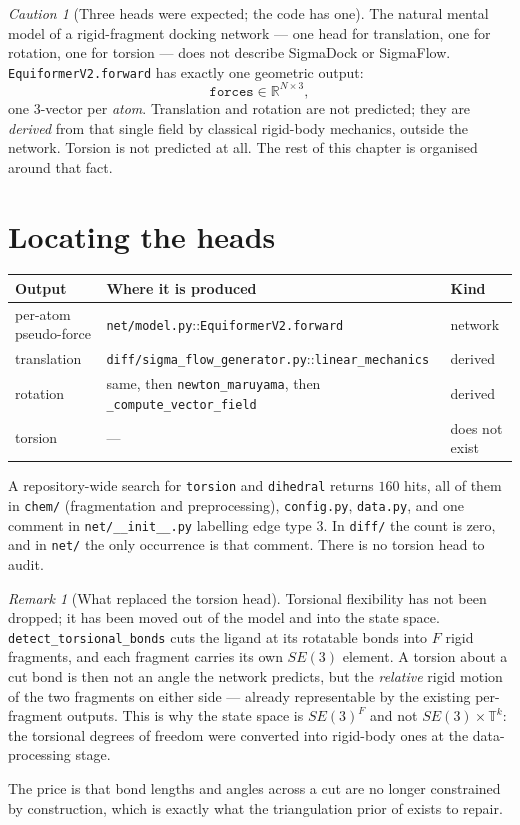 \documentclass[11pt,a4paper]{report}
\theoremstyle{definition}
\theoremstyle{remark}
\newtheorem{remark}[remark]{Remark}
\newtheorem{caution}[caution]{Caution}
\newcommand{\RR}{\mathbb R}
\newcommand{\file}[1]{\texttt{#1}}
\newcommand{\pyfunc}[1]{\texttt{#1}}
\begin{document}
\begin{caution}[Three heads were expected; the code has one]
\label{caution:one-head-not-three}
The natural mental model of a rigid-fragment docking network --- one head for
translation, one for rotation, one for torsion --- does not describe
SigmaDock or SigmaFlow. \pyfunc{EquiformerV2.forward} has exactly one
geometric output:
\[
\texttt{forces}\in\RR^{N\times3},
\]
one $3$-vector per \emph{atom}. Translation and rotation are not predicted;
they are \emph{derived} from that single field by classical rigid-body
mechanics, outside the network. Torsion is not predicted at all. The rest of
this chapter is organised around that fact.
\end{caution}

\section{Locating the heads}
\label{sec:heads-locate}

\begin{center}
\begin{tabular}{lll}
\toprule
Output & Where it is produced & Kind \\
\midrule
per-atom pseudo-force & \file{net/model.py}::\pyfunc{EquiformerV2.forward} & network \\
translation & \file{diff/sigma\_flow\_generator.py}::\pyfunc{linear\_mechanics} & derived \\
rotation & same, then \pyfunc{newton\_maruyama}, then \pyfunc{\_compute\_vector\_field} & derived \\
torsion & --- & does not exist \\
\bottomrule
\end{tabular}
\end{center}

A repository-wide search for \texttt{torsion} and \texttt{dihedral} returns
$160$ hits, all of them in \file{chem/} (fragmentation and preprocessing),
\file{config.py}, \file{data.py}, and one comment in \file{net/\_\_init\_\_.py}
labelling edge type $3$. In \file{diff/} the count is zero, and in
\file{net/} the only occurrence is that comment. There is no torsion head to
audit.

\begin{remark}[What replaced the torsion head]
\label{rem:torsion-is-fragmentation}
Torsional flexibility has not been dropped; it has been moved out of the
model and into the state space. \pyfunc{detect\_torsional\_bonds} cuts the
ligand at its rotatable bonds into $F$ rigid fragments, and each fragment
carries its own $SE(3)$ element. A torsion about a cut bond is then not an
angle the network predicts, but the \emph{relative} rigid motion of the two
fragments on either side --- already representable by the existing per-fragment
outputs. This is why the state space is $SE(3)^F$ and not
$SE(3)\times\mathbb T^k$: the torsional degrees of freedom were converted
into rigid-body ones at the data-processing stage.

The price is that bond lengths and angles across a cut are no longer
constrained by construction, which is exactly what the triangulation prior of
 exists to repair.
\end{remark}
\end{document}
